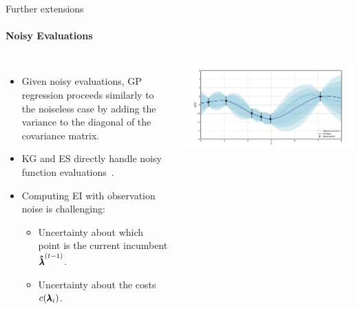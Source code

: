 \begin{frame}[c]{Further extensions}
\framesubtitle{Noisy Evaluations}

\small

\begin{columns}[T]


    \begin{itemize}
        \item Given noisy evaluations, GP regression proceeds similarly to the noiseless case by adding the variance to the diagonal of the covariance matrix.
        \vspace{-0.2cm}
        \item KG and ES directly handle noisy function evaluations~.
        \vspace{-0.2cm}
        \item Computing EI with observation noise is challenging:
        \vspace{-0.2cm}
        \begin{itemize}
            \item Uncertainty about which point is the current incumbent $\incumbent[\bocount-1]$.
            \item Uncertainty about the costs $\cost(\conf_i)$.
        \end{itemize}
    \end{itemize}
    
    \includegraphics[width=\textwidth]{images/extensions/BO_Loop_Noisy3.png}
    

\end{columns}
\end{frame}

